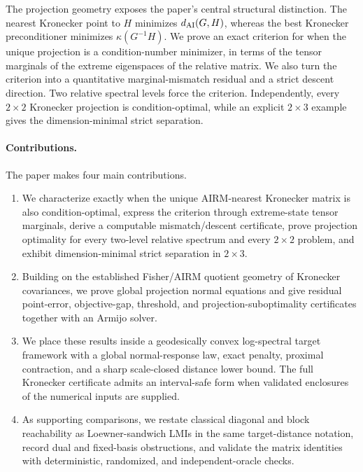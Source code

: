 The projection geometry exposes the paper's central structural distinction.
The nearest
Kronecker point to \(H\) minimizes \(d_{\mathrm{AI}}(G,H)\), whereas the best
Kronecker preconditioner minimizes \(\kappa(G^{-1}H)\).  We prove an exact
criterion for when the unique projection is a condition-number minimizer, in
terms of the tensor marginals of the extreme eigenspaces of the relative
matrix.  We also turn the criterion into a quantitative marginal-mismatch
residual and a strict descent direction.  Two relative spectral levels force
the criterion.  Independently, every \(2\times2\) Kronecker projection is
condition-optimal, while an explicit \(2\times3\) example gives the
dimension-minimal strict separation.

\paragraph{Contributions.}
The paper makes four main contributions.

\begin{enumerate}[leftmargin=*,itemsep=0.25em]
  \item We characterize exactly when the unique AIRM-nearest Kronecker matrix
  is also condition-optimal, express the criterion through extreme-state
  tensor marginals, derive a computable mismatch/descent certificate, prove
  projection optimality for every two-level relative spectrum and every
  \(2\times2\) problem, and exhibit dimension-minimal strict separation in
  \(2\times3\).

  \item Building on the established Fisher/AIRM quotient geometry of
  Kronecker covariances, we prove global projection normal equations and give
  residual point-error, objective-gap, threshold, and projection-suboptimality
  certificates together with an Armijo solver.

  \item We place these results inside a geodesically convex log-spectral
  target framework with a global normal-response law, exact penalty,
  proximal contraction, and a sharp scale-closed distance lower bound.  The
  full Kronecker certificate admits an interval-safe form when validated
  enclosures of the numerical inputs are supplied.

  \item As supporting comparisons, we restate classical diagonal and block
  reachability as Loewner-sandwich LMIs in the same target-distance notation,
  record dual and fixed-basis obstructions, and validate the matrix identities
  with deterministic, randomized, and independent-oracle checks.
\end{enumerate}

